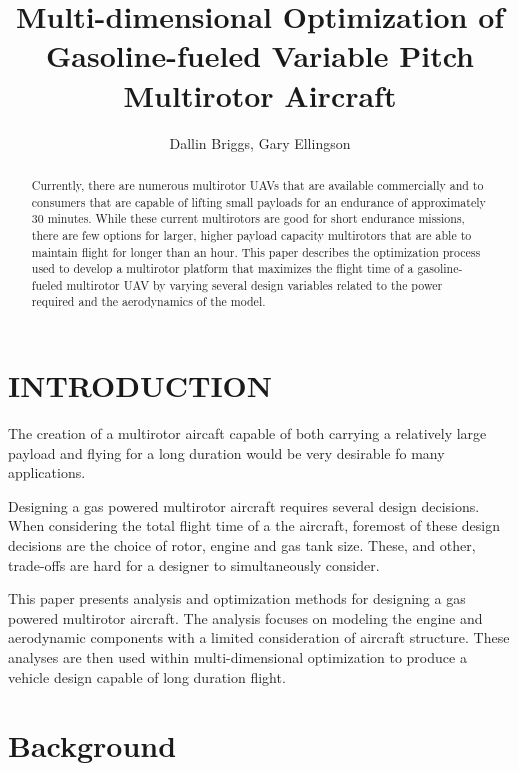 \documentclass[letterpaper, 10 pt, conference]{ieeeconf}  %
\title{\LARGE \bf
Multi-dimensional Optimization of Gasoline-fueled Variable Pitch Multirotor Aircraft
}
\author{Dallin Briggs, Gary Ellingson%
}
\begin{document}
\maketitle
\thispagestyle{empty}
\pagestyle{empty}


\begin{abstract}

Currently, there are numerous multirotor UAVs that are available commercially and to consumers that are capable of lifting small payloads for an endurance of approximately 30 minutes. While these current multirotors are good for short endurance missions, there are few options for larger, higher payload capacity multirotors that are able to maintain flight for longer than an hour. This paper describes the optimization process used to develop a multirotor platform that maximizes the flight time of a gasoline-fueled multirotor UAV by varying several design variables related to the power required and the aerodynamics of the model.

\end{abstract}


\section{INTRODUCTION}

The creation of a multirotor aircaft capable of both carrying a relatively large payload and flying for a long duration would be very desirable fo many applications.

Designing a gas powered multirotor aircraft requires several design decisions. When considering the total flight time of a the aircraft, foremost of these design decisions are the choice of rotor, engine and gas tank size.  These, and other, trade-offs are hard for a designer to simultaneously consider. 

This paper presents analysis and optimization methods for designing a gas powered multirotor aircraft.  The analysis focuses on modeling the engine and aerodynamic components with a limited consideration of aircraft structure.  These analyses are then used within multi-dimensional optimization to produce a vehicle design capable of long duration flight. 

\section{Background}
\end{document}
